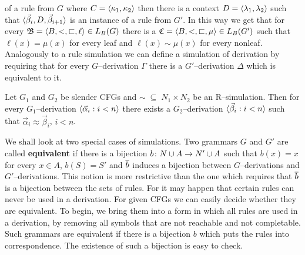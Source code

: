 of a rule from $G$ where $C = \langle \kappa_1, \kappa_2\rangle$ then
there is a context $D = \langle \lambda_1, \lambda_2\rangle$ such that
$\langle \vec{\beta}_i, D, \vec{\beta}_{i+1}\rangle$ is an instance
of a rule from $G'$. In this way we get that for every
$\mathfrak{B} = \langle B, <,\sqsubset, \ell\rangle \in L_B(G)$ there is a
$\mathfrak{C} = \langle B, <, \sqsubset, \mu\rangle \in L_B(G')$ such that
$\ell(x) = \mu(x)$ for every leaf and $\ell(x) \sim \mu(x)$
for every nonleaf. Analogously to a rule simulation we can
define a simulation of derivation by requiring that for every
$G$--derivation $\Gamma$ there is a $G'$--derivation
$\Delta$ which is equivalent to it.
\begin{prop}
Let $G_1$ and $G_2$ be slender CFGs and 
$\sim\; \subseteq \; N_1 \times N_2$ be an R--simulation. 
Then for every $G_1$--derivation
$\langle \vec{\alpha}_i : i < n\rangle$ there exists a $G_2$--derivation
$\langle \vec{\beta}_i : i < n\rangle$ such that $\vec{\alpha}_i \approx
\vec{\beta}_i$, $i < n$.
\proofend
\end{prop}
We shall look at two special cases of simulations.
Two grammars $G$ and $G'$ are called
\textbf{equivalent} if there is a bijection $b \colon N \cup A \rightarrow
N' \cup A$ such that $b(x) = x$ for every $x \in A$, $b(S) = S'$
and $\overline{b}$ induces a bijection between $G$--derivations and
$G'$--derivations. This notion is more restrictive than the
one which requires that $\overline{b}$ is a bijection between the
sets of rules.  For it may happen that certain rules can never be
used in a derivation. For given CFGs we
can easily decide whether they are equivalent. To begin, we
bring them into a form in which all rules are used in a
derivation, by removing all symbols that are not reachable
and not completable. Such grammars are equivalent if there is a
bijection $b$ which puts the rules into correspondence.
The existence of such a bijection is easy to check.

